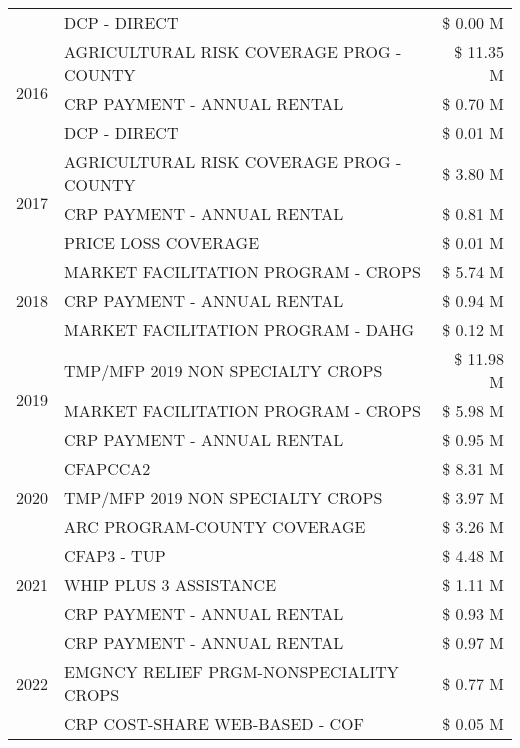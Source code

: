 \begin{tabular}{llr}
 & DCP - DIRECT & \$ 0.00 M \\
\cline{1-3}
\multirow[t]{3}{*}{2016} & AGRICULTURAL RISK COVERAGE PROG - COUNTY & \$ 11.35 M \\
 & CRP PAYMENT - ANNUAL RENTAL & \$ 0.70 M \\
 & DCP - DIRECT & \$ 0.01 M \\
\cline{1-3}
\multirow[t]{3}{*}{2017} & AGRICULTURAL RISK COVERAGE PROG - COUNTY & \$ 3.80 M \\
 & CRP PAYMENT - ANNUAL RENTAL & \$ 0.81 M \\
 & PRICE LOSS COVERAGE & \$ 0.01 M \\
\cline{1-3}
\multirow[t]{3}{*}{2018} & MARKET FACILITATION PROGRAM - CROPS & \$ 5.74 M \\
 & CRP PAYMENT - ANNUAL RENTAL & \$ 0.94 M \\
 & MARKET FACILITATION PROGRAM - DAHG & \$ 0.12 M \\
\cline{1-3}
\multirow[t]{3}{*}{2019} & TMP/MFP 2019 NON SPECIALTY CROPS & \$ 11.98 M \\
 & MARKET FACILITATION PROGRAM - CROPS & \$ 5.98 M \\
 & CRP PAYMENT - ANNUAL RENTAL & \$ 0.95 M \\
\cline{1-3}
\multirow[t]{3}{*}{2020} & CFAPCCA2 & \$ 8.31 M \\
 & TMP/MFP 2019 NON SPECIALTY CROPS & \$ 3.97 M \\
 & ARC PROGRAM-COUNTY COVERAGE & \$ 3.26 M \\
\cline{1-3}
\multirow[t]{3}{*}{2021} & CFAP3 - TUP & \$ 4.48 M \\
 & WHIP PLUS 3 ASSISTANCE & \$ 1.11 M \\
 & CRP PAYMENT - ANNUAL RENTAL & \$ 0.93 M \\
\cline{1-3}
\multirow[t]{3}{*}{2022} & CRP PAYMENT - ANNUAL RENTAL & \$ 0.97 M \\
 & EMGNCY RELIEF PRGM-NONSPECIALITY CROPS & \$ 0.77 M \\
 & CRP COST-SHARE WEB-BASED - COF & \$ 0.05 M \\
\cline{1-3}
\bottomrule
\end{tabular}
